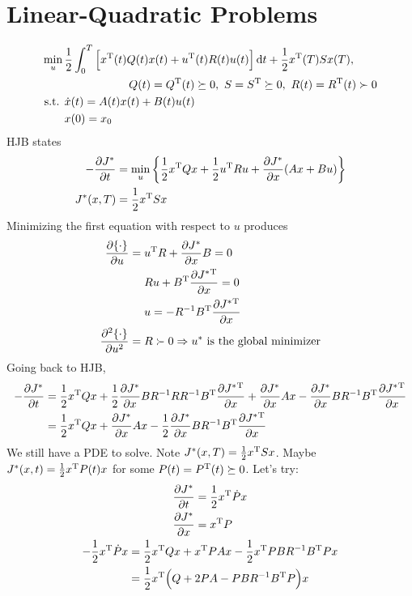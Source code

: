 \section{Linear-Quadratic Problems}
\begin{align}
  \min_u {} & \frac12 \int_0^T \Big[ x^\text{T}(t)Q(t)x(t) + u^\text{T}(t)R(t)u(t) \Big] \mathop{}\!\mathrm{d} t + \frac12 x^\text{T}(T)Sx(T), \\
            & \hspace{2cm} Q(t)=Q^\text{T}(t) \succeq 0,\ S=S^\text{T} \succeq 0,\ R(t)=R^\text{T}(t)\succ 0 \\
  \text{s.t. } & \dot x(t) = A(t)x(t) + B(t)u(t) \\
            & x(0) = x_0
\end{align}
HJB states
\begin{align}
  -\frac{\partial J^*}{\partial t} &= \min_u \left\{ \frac12 x^\text{T} Qx + \frac12 u^\text{T} Ru + \frac{\partial J^*}{\partial x}(Ax+Bu) \right\} \\
  J^*(x,T) &= \frac12 x^\text{T} Sx
\end{align}
Minimizing the first equation with respect to $u$ produces
\begin{align}
  \frac{\partial \{\cdot\}}{\partial u} ={} & u^\text{T} R + \frac{\partial J^*}{\partial x} B = 0 \\
                          & Ru + B^\text{T} \frac{\partial J^*{}^\text{T}}{\partial x} = 0 \\
                          & u = -R^{-1} B^\text{T} \frac{\partial J^*{}^\text{T}}{\partial x} \\
  \frac{\partial ^2 \{\cdot\}}{\partial u^2} ={} & R \succ 0 \Rightarrow \text{$u^*$ is the global minimizer}
\end{align}
Going back to HJB,
\begin{align}
  -\frac{\partial J^*}{\partial t} &= \frac12 x^\text{T} Qx + \frac12 \frac{\partial J^*}{\partial x}BR^{-1} R R^{-1}B^\text{T}\frac{\partial J^*{}^\text{T}}{\partial x} + \frac{\partial J^*}{\partial x}Ax - \frac{\partial J^*}{\partial x}BR^{-1}B^\text{T}\frac{\partial J^*{}^\text{T}}{\partial x} \\
                 &= \frac12 x^\text{T} Qx + \frac{\partial J^*}{\partial x}Ax - \frac12 \frac{\partial J^*}{\partial x}BR^{-1}B^\text{T}\frac{\partial J^*{}^\text{T}}{\partial x}
\end{align}
We still have a PDE to solve. Note $J^*(x,T)=\frac12 x^\text{T} Sx$. Maybe $J^*(x,t)=\frac12 x^\text{T} P(t) x$ for some $P(t)=P^\text{T}(t)\succeq 0$. Let's try:
\begin{gather}
  \begin{aligned}
    \frac{\partial J^*}{\partial t} &= \frac12 x^\text{T} \dot P x \\
    \frac{\partial J^*}{\partial x} &= x^\text{T} P
  \end{aligned} \\
  \begin{aligned}
    -\frac12 x^\text{T} \dot P x &= \frac12 x^\text{T} Q x + x^\text{T} PAx - \frac12 x^\text{T} PBR^{-1}B^\text{T} Px \\
    &= \frac12 x^\text{T} \Big( Q + 2PA - PBR^{-1}B^\text{T} P \Big) x
  \end{aligned}
\end{gather}
